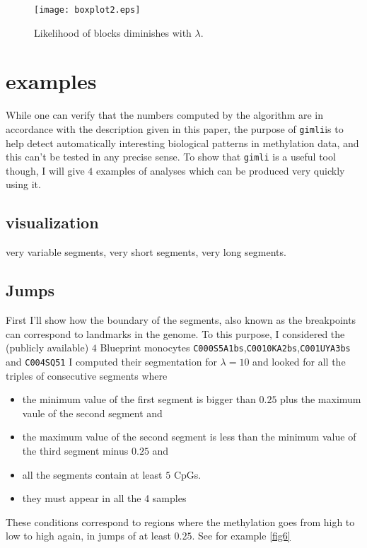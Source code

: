 \documentclass[12pt]{amsart}
\newcommand{\gimli}{\texttt{gimli}}
\begin{document}
\begin{figure}\label{fig5}
\texttt{[image: boxplot2.eps]}
\caption{Likelihood of blocks diminishes with $\lambda$.}
\end{figure}

\section{examples}

While one can verify that the numbers computed by the algorithm are in 
accordance with the description
given in this paper, the purpose of \gimli is to help 
detect automatically interesting
biological patterns in methylation data, and this can't be tested in any 
precise sense. To show that \gimli{} is a useful tool
though, I will give $4$ examples of analyses which can be produced very quickly
using it. 



\subsection{visualization}

very variable segments, very short segments, very long segments.

\subsection{Jumps}

First I'll show how the boundary of the segments, also known as the breakpoints
can correspond to landmarks in the genome. To this purpose, I considered the (publicly available)
$4$ Blueprint monocytes \verb=C000S5A1bs=,\verb=C0010KA2bs=,\verb=C001UYA3bs= and \verb=C004SQ51= 
I computed their segmentation for $\lambda=10$ and looked for all the triples of consecutive segments
where 
\begin{itemize}
\item{} the minimum value of the first segment is bigger than $0.25$ plus the maximum vaule
of the second segment and
\item{} the maximum value of the second segment is less than the minimum value of the third
segment minus $0.25$ and
\item{} all the segments contain at least $5$ CpGs.
\item{} they must appear in all the 4 samples
\end{itemize}

These conditions correspond to regions where the methylation goes from high to low to high again,
in jumps of at least $0.25$.
See for example \ref{fig6} 
\end{document}
